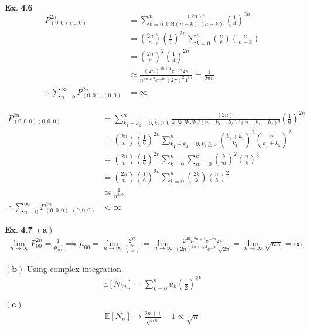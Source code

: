 \documentclass{article}
\begin{document}
\vspace{0.2in}
${\textbf{Ex. 4.6}}$
\begin{align*}
P_{(0,0)(0,0)}^{2n} &= \sum_{k=0}^{n}\frac{(2n)!}{k!k!(n-k)!(n-k)!}\left(\frac{1}{4}\right)^{2n}\\
&= \binom{2n}{n}\left(\frac{1}{4}\right)^{2n}\sum_{k=0}^{n}\binom{n}{k}\binom{n}{n-k}\\
&= \binom{2n}{n}^2\left(\frac{1}{4}\right)^{2n}\\
&\approx \frac{(2n)^{4n+1}e^{-4n}2\pi}{n^{4n+2}e^{-4n}(2\pi)^{2}4^{2n}} = \frac{1}{2\pi n}\\
\therefore \ \sum_{n=0}^{\infty}P_{(0,0),(0,0)}^{2n} &= \infty
\end{align*}

\begin{align*}
P_{(0,0,0)(0,0,0)}^{2n} &= \sum_{k_1+k_2=0, k_i\geq 0}^{n}\frac{(2n)!}{k_1!k_1!k_2!k_2!(n-k_1-k_2)!(n-k_1-k_2)!}\left(\frac{1}{6}\right)^{2n}\\
&= \binom{2n}{n}\left(\frac{1}{6}\right)^{2n}\sum_{k_1+k_2=0, k_i\geq 0}^{n}\binom{k_1+k_2}{k_1}^2\binom{n}{k_1+k_2}^{2}\\
&= \binom{2n}{n}\left(\frac{1}{6}\right)^{2n}\sum_{k=0}^{n}\sum_{m=0}^{k}\binom{k}{m}^2\binom{n}{k}^{2}\\
&= \binom{2n}{n}\left(\frac{1}{6}\right)^{2n}\sum_{k=0}^{n}\binom{2k}{k}\binom{n}{k}^{2}\\
&\propto \frac{1}{n^{3/2}}\\
\therefore \ \sum_{n=0}^{\infty}P_{(0,0,0),(0,0,0)}^{2n} &< \infty
\end{align*}

\vspace{0.2in}
${\textbf{Ex. 4.7}}$
$\mathbf{(a)}$
\begin{align*}
\lim_{n\rightarrow\infty}P_{00}^{2n} = \frac{1}{\mu_{00}} \implies \mu_{00} = \lim_{n\rightarrow\infty}\frac{2^{2n}}{\binom{2n}{n}} = \lim_{n\rightarrow\infty}\frac{2^{2n}n^{2n+1}e^{-2n}2\pi}{(2n)^{2n+1/2}e^{-2n}\sqrt{2\pi}} = \lim_{n\rightarrow\infty}\sqrt{n\pi} = \infty
\end{align*}

$\mathbf{(b)}$
Using complex integration.
\begin{align*}
\mathbb{E}[N_{2n}] = \sum_{k=0}^{n}u_k\left(\frac{1}{2}\right)^{2k}
\end{align*}

$\mathbf{(c)}$
\begin{align*}
\mathbb{E}[N_{n}] \rightarrow \frac{2n+1}{\sqrt{n\pi}}-1 \propto \sqrt{n}
\end{align*}
\end{document}
